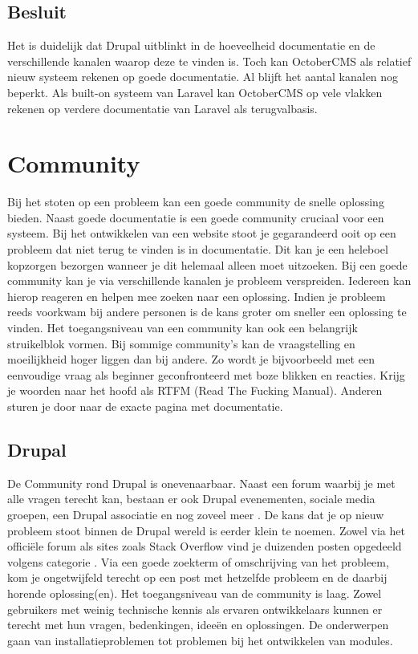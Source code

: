 \subsection{Besluit}
Het is duidelijk dat Drupal uitblinkt in de hoeveelheid documentatie en de verschillende kanalen waarop deze te vinden is. Toch kan OctoberCMS als relatief nieuw systeem rekenen op goede documentatie. Al blijft het aantal kanalen nog beperkt. Als built-on systeem van Laravel kan OctoberCMS op vele vlakken rekenen op verdere documentatie van Laravel als terugvalbasis.


\section{Community}
Bij het stoten op een probleem kan een goede community de snelle oplossing bieden. Naast goede documentatie is een goede community cruciaal voor een systeem. Bij het ontwikkelen van een website stoot je gegarandeerd ooit op een probleem dat niet terug te vinden is in documentatie. Dit kan je een heleboel kopzorgen bezorgen wanneer je dit helemaal alleen moet uitzoeken. Bij een goede community kan je via verschillende kanalen je probleem verspreiden. Iedereen kan hierop reageren en helpen mee zoeken naar een oplossing. Indien je probleem reeds voorkwam bij andere personen is de kans groter om sneller een oplossing te vinden. Het toegangsniveau van een community kan ook een belangrijk struikelblok vormen. Bij sommige community's kan de vraagstelling en moeilijkheid hoger liggen dan bij andere. Zo wordt je bijvoorbeeld met een eenvoudige vraag als beginner geconfronteerd met boze blikken en reacties. Krijg je woorden naar het hoofd als RTFM (Read The Fucking Manual). Anderen sturen je door naar de exacte pagina met documentatie. 

\subsection{Drupal}
De Community rond Drupal is onevenaarbaar. Naast een forum waarbij je met alle vragen terecht kan, bestaan er ook Drupal evenementen, sociale media groepen, een Drupal associatie en nog zoveel meer \citep{Drupal2016WhereCommunity}. De kans dat je op nieuw probleem stoot binnen de Drupal wereld is eerder klein te noemen. Zowel via het officiële forum als sites zoals Stack Overflow vind je duizenden posten opgedeeld volgens categorie \citep{Drupal2016CommunityForum}. Via een goede zoekterm of omschrijving van het probleem, kom je ongetwijfeld terecht op een post met hetzelfde probleem en de daarbij horende oplossing(en). Het toegangsniveau van de community is laag. Zowel gebruikers met weinig technische kennis als ervaren ontwikkelaars kunnen er terecht met hun vragen, bedenkingen, ideeën en oplossingen. De onderwerpen gaan van installatieproblemen tot problemen bij het ontwikkelen van modules. 

